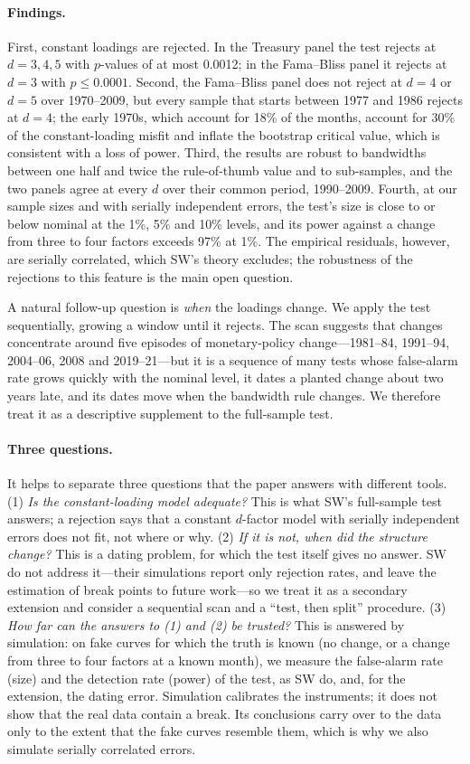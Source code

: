 \documentclass[11pt]{article}
\begin{document}
\paragraph{Findings.} First, constant loadings are rejected. In the Treasury panel the test rejects at $d=3,4,5$ with $p$-values of at most 0.0012; in the Fama--Bliss panel it rejects at $d=3$ with $p\le 0.0001$. Second, the Fama--Bliss panel does not reject at $d=4$ or $d=5$ over 1970--2009, but every sample that starts between 1977 and 1986 rejects at $d=4$; the early 1970s, which account for 18\% of the months, account for 30\% of the constant-loading misfit and inflate the bootstrap critical value, which is consistent with a loss of power. Third, the results are robust to bandwidths between one half and twice the rule-of-thumb value and to sub-samples, and the two panels agree at every $d$ over their common period, 1990--2009. Fourth, at our sample sizes and with serially independent errors, the test's size is close to or below nominal at the 1\%, 5\% and 10\% levels, and its power against a change from three to four factors exceeds 97\% at 1\%. The empirical residuals, however, are serially correlated, which SW's theory excludes; the robustness of the rejections to this feature is the main open question.

A natural follow-up question is \emph{when} the loadings change. We apply the test sequentially, growing a window until it rejects. The scan suggests that changes concentrate around five episodes of monetary-policy change---1981--84, 1991--94, 2004--06, 2008 and 2019--21---but it is a sequence of many tests whose false-alarm rate grows quickly with the nominal level, it dates a planted change about two years late, and its dates move when the bandwidth rule changes. We therefore treat it as a descriptive supplement to the full-sample test.

\paragraph{Three questions.} It helps to separate three questions that the paper answers with different tools. (1) \emph{Is the constant-loading model adequate?} This is what SW's full-sample test answers; a rejection says that a constant $d$-factor model with serially independent errors does not fit, not where or why. (2) \emph{If it is not, when did the structure change?} This is a dating problem, for which the test itself gives no answer. SW do not address it---their simulations report only rejection rates, and leave the estimation of break points to future work---so we treat it as a secondary extension and consider a sequential scan and a ``test, then split'' procedure. (3) \emph{How far can the answers to (1) and (2) be trusted?} This is answered by simulation: on fake curves for which the truth is known (no change, or a change from three to four factors at a known month), we measure the false-alarm rate (size) and the detection rate (power) of the test, as SW do, and, for the extension, the dating error. Simulation calibrates the instruments; it does not show that the real data contain a break. Its conclusions carry over to the data only to the extent that the fake curves resemble them, which is why we also simulate serially correlated errors.
\end{document}
